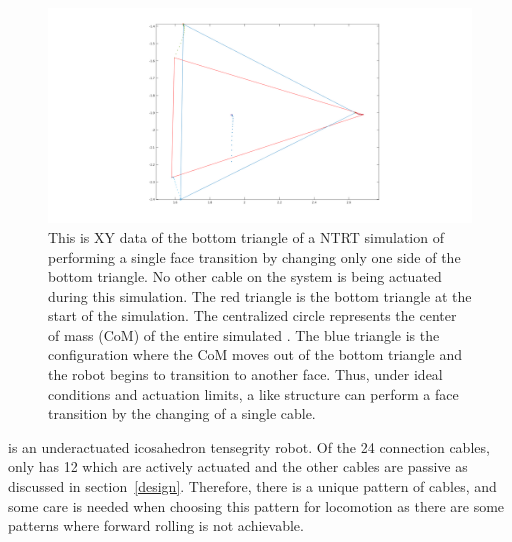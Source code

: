 \label{hand_stepwise}
\begin{figure}[thpb]
      \centering
      \includegraphics[width=1\columnwidth]{tex/img/Single_flop_bottom_triangle}
      \caption{This is XY data of the bottom triangle of a NTRT simulation of \SB{} performing a single face transition by changing only one side of the bottom triangle.
      No other cable on the system is being actuated during this simulation.
      The red triangle is the bottom triangle at the start of the simulation. 
      The centralized circle represents the center of mass (CoM) of the entire simulated \SB{}. 
      The blue triangle is the configuration where the CoM moves out of the bottom triangle and the robot begins to transition to another face.
      Thus, under ideal conditions and actuation limits, a \SB{} like structure can perform a face transition by the changing of a single cable.}
      \label{fig:single_flop}
\end{figure}

\SB{} is an underactuated icosahedron tensegrity robot.
Of the 24 connection cables, \SB{} only has 12 which are actively actuated and the other cables are passive as discussed in section~\ref{design}.
Therefore, there is a unique pattern of cables, and some care is needed when choosing this pattern for locomotion as there are some patterns where forward rolling is not achievable. 


